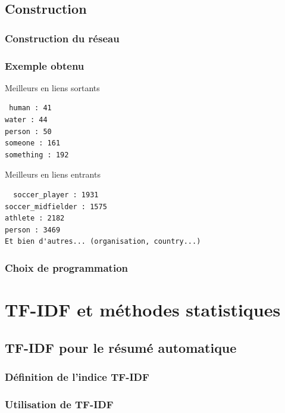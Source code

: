 \documentclass[12pt]{beamer}
\begin{document}
\subsection{Construction}

\begin{frame}
 \frametitle{Construction du réseau}
 
 
\end{frame}

\begin{frame}[fragile]
 \frametitle{Exemple obtenu}
 
 \begin{block}{Meilleurs en liens sortants}
 \begin{verbatim}
 human : 41
water : 44
person : 50
someone : 161
something : 192 
\end{verbatim}
 \end{block}

 \begin{block}{Meilleurs en liens entrants}
 \begin{verbatim}
  soccer_player : 1931
soccer_midfielder : 1575
athlete : 2182
person : 3469
Et bien d'autres... (organisation, country...)
\end{verbatim}
 \end{block}

\end{frame}


\begin{frame}
 \frametitle{Choix de programmation}
 
 
\end{frame}


\section{TF-IDF et méthodes statistiques}

\subsection{TF-IDF pour le résumé automatique}

\begin{frame}
 \frametitle{Définition de l'indice TF-IDF}
 
 
\end{frame}

\begin{frame}
 \frametitle{Utilisation de TF-IDF}
 
 
\end{frame}
\end{document}
